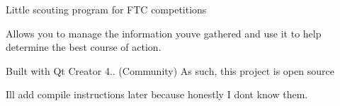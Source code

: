 Little scouting program for F\+TC competitions

Allows you to manage the information you\textquotesingle{}ve gathered and use it to help determine the best course of action.

Built with Qt Creator 4.. (Community) As such, this project is open source

I\textquotesingle{}ll add compile instructions later because honestly I don\textquotesingle{}t know them. 